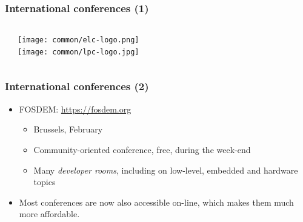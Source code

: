 \begin{frame}
  \frametitle{International conferences (1)}
  \begin{columns}
    \begin{itemize}
    
    
    \end{itemize}
    \begin{center}
      \texttt{[image: common/elc-logo.png]}\\
      \vspace{1cm}
      \texttt{[image: common/lpc-logo.jpg]}\\
    \end{center}
  \end{columns}
\end{frame}

\begin{frame}
  \frametitle{International conferences (2)}
  \begin{itemize}
  \item FOSDEM: \url{https://fosdem.org}
    \begin{itemize}
    \item Brussels, February
    \item Community-oriented conference, free, during the week-end
    \item Many {\em developer rooms}, including on low-level, embedded
      and hardware topics
    \end{itemize}
  \item Most conferences are now also accessible on-line, which makes
    them much more affordable.
  \end{itemize}
\end{frame}
